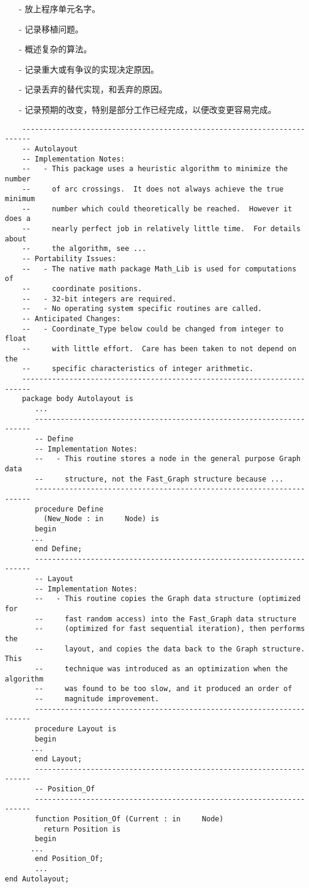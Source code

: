 \begin{itemize}
    \item[-] 放上程序单元名字。
    \item[-] 记录移植问题。
    \item[-] 概述复杂的算法。
    \item[-] 记录重大或有争议的实现决定原因。
    \item[-] 记录丢弃的替代实现，和丢弃的原因。
    \item[-] 记录预期的改变，特别是部分工作已经完成，以便改变更容易完成。
\end{itemize}

\begin{lstlisting}
    ------------------------------------------------------------------------
    -- Autolayout
    -- Implementation Notes:
    --   - This package uses a heuristic algorithm to minimize the number
    --     of arc crossings.  It does not always achieve the true minimum
    --     number which could theoretically be reached.  However it does a
    --     nearly perfect job in relatively little time.  For details about
    --     the algorithm, see ...
    -- Portability Issues:
    --   - The native math package Math_Lib is used for computations of
    --     coordinate positions.
    --   - 32-bit integers are required.
    --   - No operating system specific routines are called.
    -- Anticipated Changes:
    --   - Coordinate_Type below could be changed from integer to float
    --     with little effort.  Care has been taken to not depend on the
    --     specific characteristics of integer arithmetic.
    ------------------------------------------------------------------------
    package body Autolayout is
       ...
       ---------------------------------------------------------------------
       -- Define
       -- Implementation Notes:
       --   - This routine stores a node in the general purpose Graph data
       --     structure, not the Fast_Graph structure because ...
       ---------------------------------------------------------------------
       procedure Define
	     (New_Node : in     Node) is
       begin
	  ...
       end Define;
       ---------------------------------------------------------------------
       -- Layout
       -- Implementation Notes:
       --   - This routine copies the Graph data structure (optimized for
       --     fast random access) into the Fast_Graph data structure
       --     (optimized for fast sequential iteration), then performs the
       --     layout, and copies the data back to the Graph structure.  This
       --     technique was introduced as an optimization when the algorithm
       --     was found to be too slow, and it produced an order of
       --     magnitude improvement.
       ---------------------------------------------------------------------
       procedure Layout is
       begin
	  ...
       end Layout;
       ---------------------------------------------------------------------
       -- Position_Of
       ---------------------------------------------------------------------
       function Position_Of (Current : in     Node)
	     return Position is
       begin
	  ...
       end Position_Of;
       ...
end Autolayout;
\end{lstlisting}

